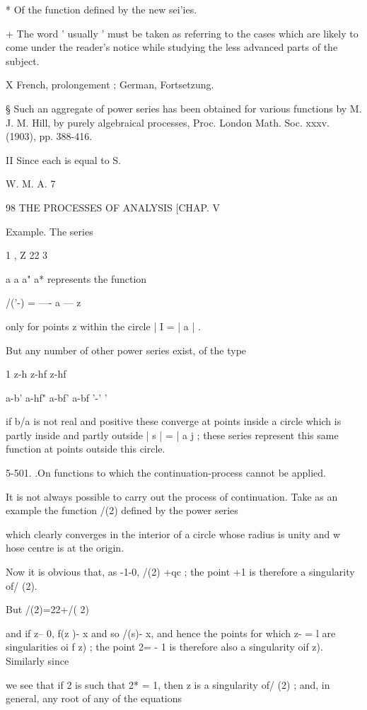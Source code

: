 {{* Of the function defined by the new sei'ies. 

+ The word ' usually ' must be taken as referring to the cases which are likely to come 
under the reader's notice while studying the less advanced parts of the subject. 

X French, prolongement ; German, Fortsetzung. 

§ Such an aggregate of power series has been obtained for various functions by M. J. M. Hill, 
by purely algebraical processes, Proc. London Math. Soc. xxxv. (1903), pp. 388-416. 

II Since each is equal to S. 

W. M. A. 7 



98 THE PROCESSES OF ANALYSIS [CHAP. V 

Example. The series 

1 , Z 22  3 

a a  a"  a* 
represents the function 

/('-) = —- 
a — z 

only for points z within the circle |   I = | a | . 

But any number of other power series exist, of the type 

1 z-h  z-hf  z-hf 

a-b'   a-hf"   a-bf'   a-bf '-' ' 

if b/a is not real and positive these converge at points inside a circle which is partly 
inside and partly outside | s | = | a j ; these series represent this same function at points 
outside this circle. 

5-501. .On functions to which the continuation-process cannot be applied. 

It is not always possible to carry out the process of continuation. Take as an example 
the function /(2) defined by the power series 

which clearly converges in the interior of a circle whose radius is unity and w hose centre 
is at the origin. 

Now it is obvious that, as  -1-0, /(2) +qc ; the point +1 is therefore a 
singularity of/ (2). 

But /(2)=22+/( 2)  

and if z--  0, f(z )- x and so /(s)- x, and hence the points for which z- = l are 
singularities oi f z) ; the point 2= - 1 is therefore also a singularity oif z). 
Similarly since 

we see that if 2 is such that 2* = 1, then z is a singularity of/ (2) ; and, in general, any root 
of any of the equations 

}}
